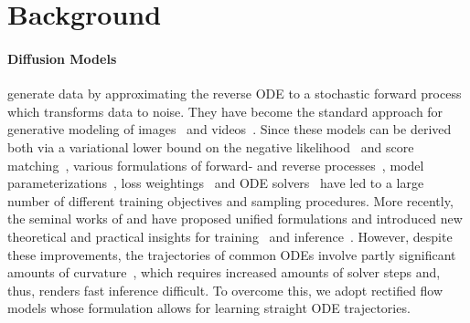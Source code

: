 \section{Background}
\label{sec:background}

\paragraph{Diffusion Models}\citep{SohlDickstein2015DeepUL,Song2020ScoreBasedGM,ho2020denoising} generate data by approximating the reverse ODE to a stochastic forward process which transforms data to noise. They have become the standard approach for generative modeling of  images~\cite{dhariwal2021diffusion,ramesh2022hierarchical,saharia2022photorealistic,Rombach_2022,balaji2022ediffi} and videos~\citep{singer2022makeavideo,ho2022imagen,esser2023structure, blattmann2023align,gupta2023photorealistic}. Since these models can be derived both via a variational lower bound on the negative likelihood~\citep{SohlDickstein2015DeepUL} and score matching~\citep{Hyvrinen2005EstimationON,Vincent2011ACB,song2020generative}, 
%
various formulations of forward- and reverse processes~\citep{Song2020ScoreBasedGM,dockhorn2021score}, model parameterizations~\citep{ho2020denoising,ho2022classifierfree,Karras2022ElucidatingTD}, loss weightings~\citep{ho2020denoising, Karras2022ElucidatingTD} and ODE 
solvers~\citep{song2022denoising,lu2023dpmsolver, dockhorn2022genie} have led to a large number of different training objectives and sampling procedures. More recently, the seminal works of \citet{Kingma2023UnderstandingDO} and \citet{Karras2022ElucidatingTD} have proposed unified formulations and introduced new theoretical and practical insights for training~\cite{Karras2022ElucidatingTD,Kingma2023UnderstandingDO} and inference~\cite{Karras2022ElucidatingTD}. However, despite these improvements, the trajectories of common ODEs involve partly significant amounts of curvature~\citep{Karras2022ElucidatingTD,liu2022flow}, which requires increased amounts of solver steps and, thus, renders fast inference difficult. To overcome this, we adopt rectified flow models whose formulation allows for learning straight ODE trajectories.  

